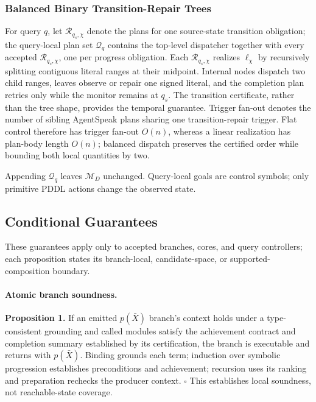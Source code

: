 \subsubsection{Balanced Binary Transition-Repair Trees}
\label{sec:balanced-trees}

For query $q$, let $\mathcal R_{q_s,\chi}$ denote the plans for one source-state
transition obligation; the query-local plan set $\mathcal Q_q$ contains the
top-level dispatcher together with every accepted $\mathcal R_{q_s,\chi}$, one
per progress obligation. Each $\mathcal R_{q_s,\chi}$ realizes
$\boldsymbol\ell_\chi$ by recursively splitting contiguous literal ranges at
their midpoint. Internal nodes dispatch two child ranges, leaves observe or
repair one signed literal, and the completion plan retries only while the
monitor remains at $q_s$. The transition certificate, rather than the tree
shape, provides the temporal guarantee. Trigger fan-out denotes the number of sibling
AgentSpeak plans sharing one transition-repair trigger. Flat control therefore
has trigger fan-out $O(n)$, whereas a linear realization has plan-body length
$O(n)$; balanced dispatch preserves the certified order while bounding both
local quantities by two.

Appending $\mathcal Q_q$ leaves $\mathcal M_D$ unchanged. Query-local goals are
control symbols; only primitive PDDL actions change the observed state.

\subsection{Conditional Guarantees}
\label{sec:guarantees}

These guarantees apply only to accepted branches, cores, and query controllers;
each proposition states its branch-local, candidate-space, or
supported-composition boundary.

\paragraph{Atomic branch soundness.}
\textbf{Proposition 1.} If an emitted $p(\bar X)$ branch's context holds under a
type-consistent grounding and called modules satisfy the achievement
contract and completion summary established by its certification, the branch
is executable and returns with $p(\bar X)$. Binding grounds each term; induction
over symbolic progression establishes preconditions and achievement;
recursion uses its ranking and preparation rechecks the producer context.
\hfill$\square$ This establishes local soundness, not
reachable-state coverage.

